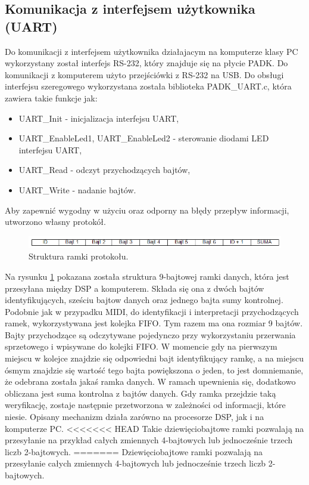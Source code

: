 \subsection{Komunikacja z interfejsem użytkownika (UART)}
Do komunikacji z interfejsem użytkownika działajacym na komputerze klasy PC wykorzystany został interfejs RS-232, który znajduje się na płycie PADK. Do komunikacji z komputerem użyto przejściówki z RS-232 na USB. 
Do obsługi interfejsu szeregowego wykorzystana została biblioteka PADK\_UART.c, która zawiera takie funkcje jak:
\begin{itemize}
	\item UART\_Init - inicjalizacja interfejsu UART,
	\item UART\_EnableLed1, UART\_EnableLed2 - sterowanie diodami LED interfejsu UART,
	\item UART\_Read - odczyt przychodzących bajtów,
	\item UART\_Write - nadanie bajtów.
\end{itemize}
Aby zapewnić wygodny w użyciu oraz odporny na błędy przepływ informacji, utworzono własny protokół.
\begin{figure}[H]
	\centering
	\includegraphics[width=16cm]{./grafiki/real_uartframe}
	\captionsetup{justification=centering}
	\caption{Struktura ramki protokołu.}
	\label{rys:real_uartframe}
\end{figure}
Na rysunku \ref{rys:real_uartframe} pokazana została struktura 9-bajtowej ramki danych, która jest przesyłana między DSP a komputerem. Składa się ona z dwóch bajtów identyfikujących, sześciu bajtow danych oraz jednego bajta sumy kontrolnej. Podobnie jak w przypadku MIDI, do identyfikacji i interpretacji przychodzących ramek, wykorzystywana jest kolejka FIFO. Tym razem ma ona rozmiar 9 bajtów. Bajty przychodzące są odczytywane pojedynczo przy wykorzystaniu przerwania sprzetowego i wpisywane do kolejki FIFO. W momencie gdy na pierwszym miejscu w kolejce znajdzie się odpowiedni bajt identyfikujący ramkę, a na miejscu ósmym znajdzie się wartość tego bajta powiększona o jeden, to jest domniemanie, że odebrana została jakaś ramka danych. W ramach upewnienia się, dodatkowo obliczana jest suma kontrolna z bajtów danych. Gdy ramka przejdzie taką weryfikację, zostaje następnie przetworzona w zależności od informacji, które niesie. Opisany mechanizm działa zarówno na procesorze DSP, jak i na komputerze PC.
<<<<<<< HEAD
Takie dziewięciobajtowe ramki pozwalają na przesyłanie na przykład całych zmiennych 4-bajtowych lub jednocześnie trzech liczb 2-bajtowych. 
=======
Dziewięciobajtowe ramki pozwalają na przesyłanie całych zmiennych 4-bajtowych lub jednocześnie trzech liczb 2-bajtowych. 



